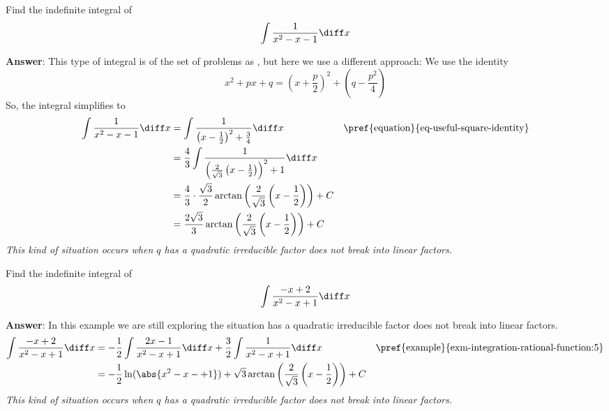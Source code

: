 \begin{exm}\label{exm-integration-rational-function:5}
	Find the indefinite integral of
	\begin{equation*}
		\int \frac{1}{x^2-x-1} \diff x
	\end{equation*}
	\begin{flushleft}
		\textbf{Answer}: This type of integral is of the set of problems as
		, but here we use a
		different approach: We use the identity
		\begin{equation}\label{eq-useful-square-identity}
			x^2 + px + q = \left(x+\frac{p}{2}\right)^2 + \left(q - \frac{p^2}{4}\right)
		\end{equation}
		So, the integral simplifies to
		\begin{align*}
			\int \frac{1}{x^2-x-1} \diff x
			 & = \int \frac{1}{\left(x-\frac{1}{2}\right)^2+\frac{3}{4}} \diff x                                           &  & \text{\pref{equation}{eq-useful-square-identity}} \\
			 & = \frac{4}{3} \int \frac{1}{\left(\frac{2}{\sqrt{3}}\left(x-\frac{1}{2}\right)\right)^2+1} \diff x                                                                 \\
			 & = \frac{4}{3} \cdot \frac{\sqrt{3}}{2} \arctan\left(\frac{2}{\sqrt{3}}\left(x-\frac{1}{2}\right)\right) + C                                                        \\
			 & = \frac{2\sqrt{3}}{3} \arctan\left(\frac{2}{\sqrt{3}}\left(x-\frac{1}{2}\right)\right) + C                                                                         \\
		\end{align*}
		\textit{This kind of situation occurs when $q$ has a quadratic irreducible
			factor does not break into linear factors.}
	\end{flushleft}
\end{exm}

\begin{exm}\label{exm-integration-rational-function:6}
	Find the indefinite integral of
	\begin{equation*}
		\int \frac{-x+2}{x^2-x+1} \diff x
	\end{equation*}
	\begin{flushleft}
		\textbf{Answer}: In this example we are still exploring the situation
		has a quadratic irreducible factor does not break into linear factors.
		\begin{align*}
			\int \frac{-x+2}{x^2-x+1} \diff x
			 & = -\frac{1}{2} \int \frac{2x-1}{x^2-x+1} \diff x + \frac{3}{2}\int \frac{1}{x^2-x+1} \diff x                      &  & \text{\pref{example}{exm-integration-rational-function:5}} \\
			 & = -\frac{1}{2}\ln(\abs{x^2-x-+1}) + \sqrt{3} \arctan\left(\frac{2}{\sqrt{3}}\left(x-\frac{1}{2}\right)\right) + C
		\end{align*}
		\textit{This kind of situation occurs when $q$ has a quadratic irreducible
			factor does not break into linear factors.}
	\end{flushleft}
\end{exm}

